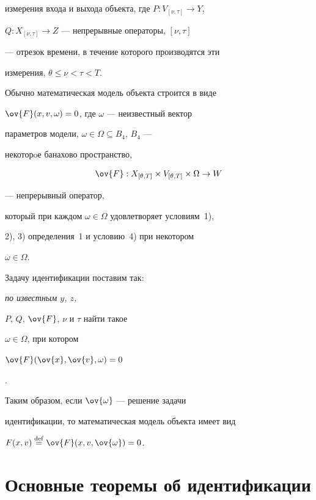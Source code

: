 измерения входа и выхода объекта, где $P:V_{[\nu,\tau]}\to Y$,\linebreak


$Q:X_{[\nu,\tau]}\to Z$ --- непрерывные операторы, $[\nu,\tau]$


--- отрезок времени, в течение которого производятся эти


измерения, $\theta\leq\nu <\tau<T$.





Обычно математическая модель объекта строится в виде


$\ov{F}(x,v,\omega)=0$, где $\omega$ --- неизвестный вектор


параметров модели, $\omega\in\Omega\subseteq B_4$, $B_4$ ---


некоторoе банахово пространство,


$$


\ov{F}:X_{[\theta,T]}\times V_{[\theta,T]}\times\Omega\to W


$$


--- непрерывный оператор,


который при каждом $\omega\in\Omega$ удовлетворяет условиям~1),


2), 3) определения~1 и условию~4) при некотором


$\omega\in\Omega$.





Задачу идентификации поставим так: {\it по известным $y$, $z$,


$P$, $Q$, $\ov{F}$, $\nu$ и $\tau$ найти такое


$\omega\in\Omega$, при котором


$\ov{F}(\ov{x},\ov{v},\omega)=0$}.





Таким образом, если $\ov{\omega}$ --- решение задачи


идентификации, то математическая модель объекта имеет вид


$F(x,v)\eqdef \ov{F}(x,v,\ov{\omega})=0$.








\section{Основные теоремы об идентификации}





